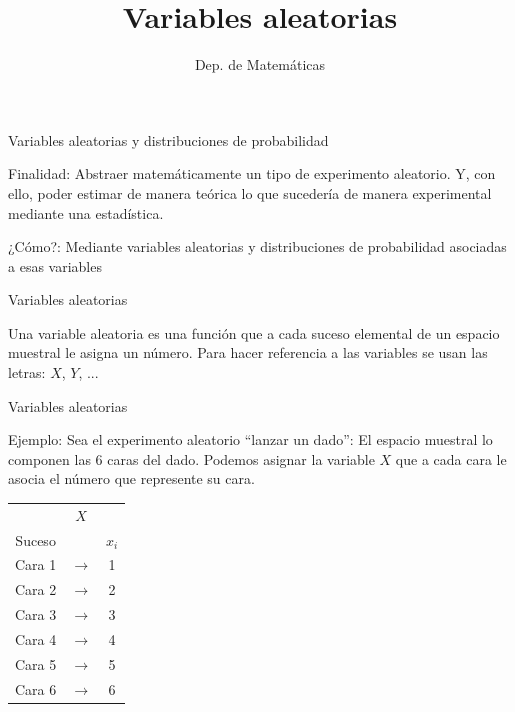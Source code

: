 \documentclass[11pt,handout]{beamer}
\title{Variables aleatorias}
\date{}
\author{Dep. de Matemáticas}
\begin{document}
\begin{frame}
\titlepage
\end{frame}


\begin{frame}{Variables aleatorias y distribuciones de probabilidad}
\begin{block}{Finalidad:} Abstraer matemáticamente un tipo de experimento aleatorio. Y, con ello, poder estimar de manera teórica lo que sucedería de manera experimental mediante una estadística.
\end{block}

\pause

\begin{block}{¿Cómo?:} Mediante variables aleatorias y distribuciones de probabilidad asociadas a esas variables

\end{block}


\end{frame}

\begin{frame}{Variables aleatorias}
\begin{block}{}
Una variable aleatoria es una función que a cada suceso
elemental de un espacio muestral le asigna un número. Para hacer referencia a las variables se usan las letras: $X$, $Y$, ...
\end{block}
\end{frame}

\begin{frame}{Variables aleatorias}
\begin{block}{Ejemplo:}
Sea el experimento aleatorio “lanzar un dado”: El espacio muestral lo componen las 6 caras del dado. Podemos asignar la variable $X$ que a cada cara le asocia el número que represente su cara.
\end{block}
\begin{center}
\begin{tabular}{ccc}
 & $X$ &  \\
Suceso &  &  $x_i$\\ \hline 
Cara 1 & $\rightarrow$ & 1 \\ 
Cara 2 & $\rightarrow$ & 2 \\ 
Cara 3 & $\rightarrow$ & 3 \\ 
Cara 4 & $\rightarrow$ & 4 \\ 
Cara 5 & $\rightarrow$ & 5 \\ 
Cara 6 & $\rightarrow$ & 6 \\ 
\end{tabular} 
\end{center}
\end{frame}
\end{document}
